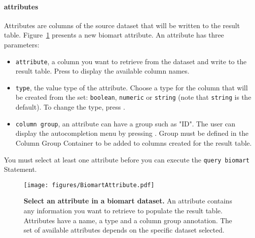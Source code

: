 \paragraph{attributes}
Attributes are columns of the source dataset that will be written to the result table. Figure~\ref{fig:attributeBiomart} presents a new biomart attribute. An attribute has three parameters:
\begin{itemize}

\item \texttt{attribute}, a column you want to retrieve from the dataset and write to the result table. Press \keys{\ctrl+\space} to display the available column names.
\item \texttt{type}, the value type of the attribute. Choose a type for the column that will be created from the set: \texttt{boolean}, \texttt{numeric} or \texttt{string} (note that \texttt{string} is the default). To change the type, press \keys{\ctrl+\space}.
\item \texttt{column group}, an attribute can have a group such as "ID". The user can display the autocompletion menu by pressing \keys{\ctrl+\space}. Group must be defined in the Column Group Container to be added to columns created for the result table.
\end{itemize}

\begin{remark}
You must select at least one attribute before you can execute the \texttt{query biomart} Statement.
\end{remark}

 \begin{figure}[h!tbp]
  \centering
  \texttt{[image: figures/BiomartAttribute.pdf]}
\caption[Select an attribute in a biomart dataset.]{\textbf{Select an attribute in a biomart dataset.} An attribute contains any information you want to retrieve to populate the result table. Attributes have a name, a type and a column group annotation. The set of available attributes depends on the specific dataset selected.}
\label{fig:attributeBiomart}
\end{figure}
